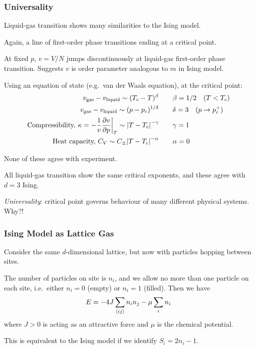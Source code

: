 \documentclass[a4paper,11pt]{article}
\begin{document}
	\subsubsection{Universality}

	Liquid-gas transition shows many similarities to the Ising model.

	Again, a line of first-order phase transitions ending at a critical point.

	At fixed $p$, $v = V/N$ jumps discontinuously at liquid-gas first-order phase transition. Suggests $v$ is order parameter analogous to $m$ in Ising model.

	Using an equation of state (e.g.\ van der Waals equation), at the critical point:
	\begin{align*}
		v_{\text{gas}} - v_{\text{liquid}} \sim (T_c - T)^{\beta} \qquad & \beta = 1/2 \quad (T < T_c)\\
		v_{\text{gas}} - v_{\text{liquid}} \sim (p - p_c)^{1/\delta} \qquad & \delta = 3 \quad(p \to p_c^+)\\
		\text{Compressibility, } \kappa = - \frac{1}{v}\pdv{v}{p}\bigg|_{T}\sim \abs{T - T_c}^{-\gamma} \qquad & \gamma = 1\\
		\text{Heat capacity, } C_V \sim C_{\pm}\abs{T - T_c}^{-\alpha} \qquad & \alpha = 0
	\end{align*}
	
	None of these agree with experiment.

	All liquid-gas transition show the same critical exponents, and these agree with $d = 3$ Ising.

	\emph{Universality}: critical point governs behaviour of many different physical systems. Why?!

	\subsubsection{Ising Model as Lattice Gas}

	Consider the same $d$-dimensional lattice, but now with particles hopping between sites.

	The number of particles on site is $n_i$, and we allow no more than one particle on each site, i.e.\ either $n_i = 0$ (empty) or $n_i = 1$ (filled). Then we have
	\[
		E = - 4 J \sum_{\expval{ij}}n_i n_j - \mu \sum_i n_i
	\]
	where $J > 0$ is acting as an attractive force and $\mu$ is the chemical potential.

	This is equivalent to the Ising model if we identify $S_i = 2n_i - 1$. 
\end{document}
